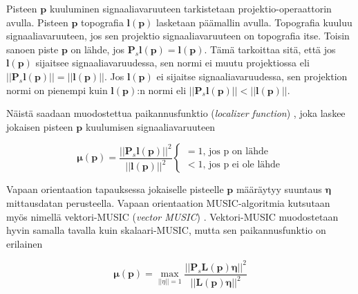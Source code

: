 Pisteen $\mathbf{p}$ kuuluminen signaaliavaruuteen tarkistetaan projektio-operaattorin avulla. Pisteen $\mathbf{p}$ topografia $\mathbf{l(p)}$ lasketaan päämallin avulla. Topografia kuuluu signaaliavaruuteen, jos sen projektio signaaliavaruuteen on topografia itse. Toisin sanoen piste $\mathbf{p}$ on lähde, jos $\mathbf{P}_s\mathbf{l(p)} = \mathbf{l(p)}$. Tämä tarkoittaa sitä, että jos $\mathbf{l(p)}$ sijaitsee signaaliavaruudessa, sen normi ei muutu projektiossa eli $||\mathbf{P}_s\mathbf{l(p)}||=||\mathbf{l(p)}||$. Jos $\mathbf{l(p)}$ ei sijaitse signaaliavaruudessa, sen projektion normi on pienempi kuin $\mathbf{l(p)}$:n normi eli
$||\mathbf{P}_s\mathbf{l(p)}||<||\mathbf{l(p)}||$. \citep{Makela2018TruncatedLocalization}

Näistä saadaan muodostettua paikannusfunktio (\textit{localizer function}) \citep{Makela2018TruncatedLocalization}, joka laskee jokaisen pisteen $\mathbf{p}$ kuulumisen signaaliavaruuteen

\begin{equation}
    \mathbf{\mu(p)} = \frac{||\mathbf{P}_s\mathbf{l(p)}||^2}{||\mathbf{l(p)}||^2} 
    \begin{cases}
    =1\text{, jos p on lähde}\\
    <1\text{, jos p ei ole lähde}
     \end{cases}
\end{equation}

Vapaan orientaation tapauksessa jokaiselle pisteelle $\mathbf{p}$ määräytyy suuntaus $\mathbf{\eta}$ mittausdatan perusteella. Vapaan orientaation MUSIC-algoritmia kutsutaan myös nimellä vektori-MUSIC (\textit{vector MUSIC}) \citep{Makela2018TruncatedLocalization}. Vektori-MUSIC muodostetaan hyvin samalla tavalla kuin skalaari-MUSIC, mutta sen paikannusfunktio on erilainen

\begin{equation}
    \mathbf{\mu(p)} = \max_{||\eta||=1} \frac{||\mathbf{P}_s\mathbf{L(p)\eta}||^2}{||\mathbf{L(p)\eta}||^2}
\end{equation}
